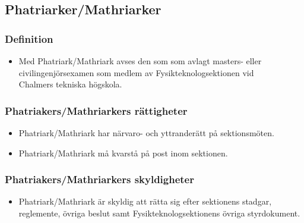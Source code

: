 \documentclass[11pt,a4paper]{article}
\begin{document}



\subsection{Phatriarker/Mathriarker}

\subsubsection{Definition}

\begin{itemize}

  \item Med Phatriark/Mathriark avses den som som avlagt masters-
  eller civil\-ingenjörs\-examen som medlem av Fysik\-teknolog\-sektionen vid\\
  Ch\-al\-mers tekniska högskola.
 
\end{itemize}

\subsubsection{Phatriakers/Mathriarkers rättigheter}

\begin{itemize}

   \item Phatriark/Mathriark har närvaro- och yttranderätt på sektionsmöten.

   \item Phatriark/Mathriark må kvarstå på post inom sektionen.

\end{itemize}

\subsubsection{Phatriakers/Mathriarkers skyldigheter}

\begin{itemize}


\item Phatriark/Mathriark är skyldig att rätta sig efter sektionens stadgar,
   regle\-mente, övriga beslut samt  Fysikteknologsektionens övriga styrdokument.
\end{itemize}
\end{document}
